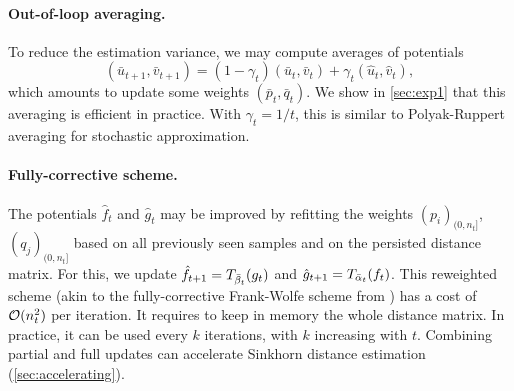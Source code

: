 \paragraph{Out-of-loop averaging.} To reduce the estimation variance,
we may compute averages of potentials
\begin{equation}
    (\bar u_{t+1}, \bar v_{t+1}) = (1 - \gamma_t) (\bar u_t, \bar v_t) + \gamma_t (\hat u_t, \hat v_t),
\end{equation}
which amounts to update some weights $(\bar p_t, \bar q_t)$. We show in \autoref{sec:exp1} that
this averaging is efficient in practice.  With $\gamma_t = 1/t$, this
is similar to Polyak-Ruppert  averaging \cite{ruppert1988efficient} for stochastic approximation.


\paragraph{Fully-corrective scheme.} 

The potentials $\hat f_t$ and $\hat g_t$ may be improved by refitting the
weights $(p_i)_{(0, n_t]}$, $(q_j)_{(0, n_t]}$ based on all previously seen
samples and on the persisted distance matrix.  For this, we update $\hat f_{t+1} = \Ctrans{g_t}{\bar \beta_t}$ and
$\hat g_{t+1} = \Ctrans{f_t}{\bar \alpha_t}$. This reweighted scheme (akin to
the fully-corrective Frank-Wolfe scheme from \cite{lacoste2015global}) has a
cost of $\Oo(n_t^2)$ per iteration. It requires to keep in memory
the whole distance matrix. In practice, it can be used every $k$ iterations,
with $k$ increasing with $t$. Combining partial and full updates
can accelerate Sinkhorn distance estimation (\autoref{sec:accelerating}).





